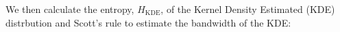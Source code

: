 We then calculate the entropy, $H_{\textrm{KDE}}$, of the Kernel Density Estimated (KDE) distrbution and Scott's rule to estimate the bandwidth of the KDE:





%
%
